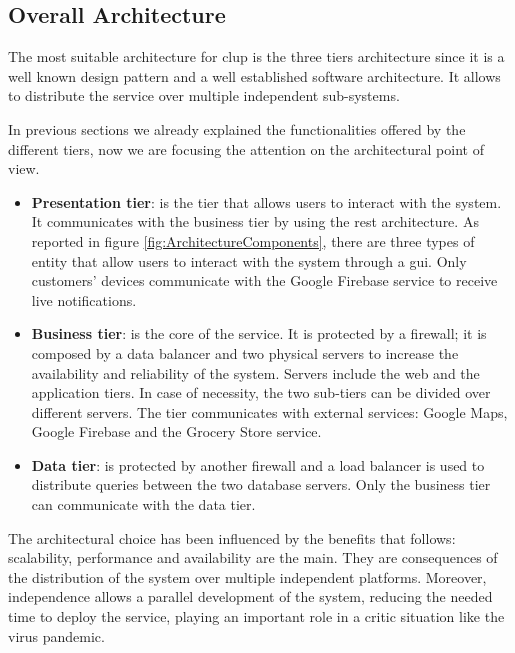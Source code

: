 \subsection{Overall Architecture}

The most suitable architecture for \gls{clup} is the three tiers architecture since it is a well known design pattern and a well established software architecture. It allows to distribute the service over multiple independent sub-systems.

In previous sections we already explained the functionalities offered by the different tiers, now we are focusing the attention on the architectural point of view.
\begin{itemize}
    \item \textbf{Presentation tier}: is the tier that allows users to interact with the system. It communicates with the business tier by using the \gls{rest} architecture.
    As reported in figure \ref{fig:ArchitectureComponents}, there are three types of entity that allow users to interact with the system through a \gls{gui}. Only customers' devices communicate with the Google Firebase service to receive live notifications.
    \item \textbf{Business tier}: is the core of the service. It is protected by a firewall; it is composed by a data balancer and two physical servers to increase the availability and reliability of the system. Servers include the web and the application tiers. In case of necessity, the two sub-tiers can be divided over different servers.
    The tier communicates with external services: Google Maps, Google Firebase and the Grocery Store service.
    \item \textbf{Data tier}: is protected by another firewall and a load balancer is used to distribute queries between the two database servers. Only the business tier can communicate with the data tier.
\end{itemize}

The architectural choice has been influenced by the benefits that follows: scalability, performance and availability are the main. They are consequences of the distribution of the system over multiple independent platforms.
Moreover, independence allows a parallel development of the system, reducing the needed time to deploy the service, playing an important role in a critic situation like the virus pandemic.

